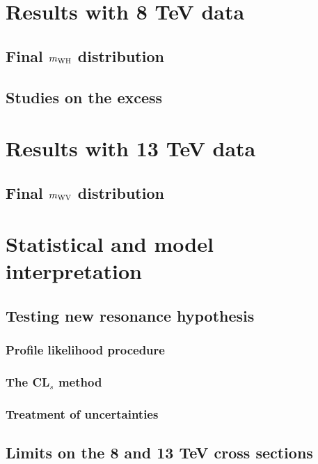 \chapter{Results with 8 TeV data}
\label{ch:results8}

\section{Final $m_{\rm WH}$ distribution}
\section{Studies on the excess}

\chapter{Results with 13 TeV data}
\label{ch:results13}

\section{Final $m_{\rm WV}$ distribution}

\chapter{Statistical and model interpretation}
\label{ch:limits}

\section{Testing new resonance hypothesis}
\subsection{Profile likelihood procedure}
\subsection{The CL$_{s}$ method}
\subsection{Treatment of uncertainties}

\section{Limits on the 8 and 13 TeV cross sections}
